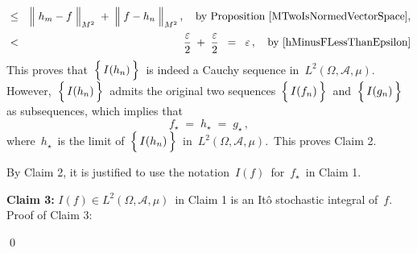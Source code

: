 \begin{enumerate}
\begin{eqnarray*}
	\\
	& \leq &
		\left\Vert\; h_{m} \overset{{\color{white}.}}{-} f \;\right\Vert_{M^{2}}
		\; + \;
		\left\Vert\; f \overset{{\color{white}.}}{-} h_{n} \;\right\Vert_{M^{2}},
		\quad
		\textnormal{by Proposition \ref{MTwoIsNormedVectorSpace}},
	\\
	& \overset{{\color{white}1}}{<} &
		\dfrac{\varepsilon}{2} \; + \; \dfrac{\varepsilon}{2}
	\;\; = \;\; \varepsilon\,,
		\quad
		\textnormal{by \eqref{hMinusFLessThanEpsilon}}
	\end{eqnarray*}
	This proves that \,$\left\{\,\overset{{\color{white}.}}{I(h_{n})}\,\right\}$\,
	is indeed a Cauchy sequence in \,$L^{2}(\Omega,\mathcal{A},\mu)$.
	However,
	\,$\left\{\,\overset{{\color{white}.}}{I(h_{n})}\,\right\}$\,
	admits the original two sequences
	\,$\left\{\,\overset{{\color{white}.}}{I(f_{n})}\,\right\}$\,
	and
	\,$\left\{\,\overset{{\color{white}.}}{I(g_{n})}\,\right\}$\,
	as subsequences, which implies that
	\begin{equation*}
	f_{\star} \; = \; h_{\star} \; = \; g_{\star}\,,
	\end{equation*}
	where \,$h_{\star}$\, is the limit of
	\,$\left\{\,\overset{{\color{white}.}}{I(h_{n})}\,\right\}$\,
	in \,$L^{2}(\Omega,\mathcal{A},\mu)$.\,
	This proves Claim 2.
	
	\vskip 0.5cm
	\noindent
	By Claim 2, it is justified to use the notation \,$I(f)$\, for \,$f_{\star}$\, in Claim 1.

	\vskip 0.5cm
	\textbf{Claim 3:}\quad
	$I(f) \in L^{2}(\Omega,\mathcal{A},\mu)$\, in Claim 1 is an It\^{o} stochastic integral of \,$f$.\,
	\vskip 0.2cm
	\noindent
	Proof of Claim 3:\quad

\end{enumerate}
\qed

